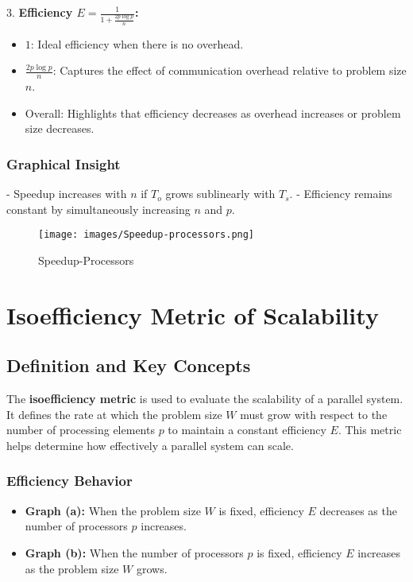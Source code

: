 \documentclass[12pt,a4paper]{article}
\begin{document}
3. \textbf{Efficiency \( E = \frac{1}{1 + \frac{2p \log p}{n}} \):}
    \begin{itemize}
        \item \( 1 \): Ideal efficiency when there is no overhead.
        \item \( \frac{2p \log p}{n} \): Captures the effect of communication overhead relative to problem size \( n \).
        \item Overall: Highlights that efficiency decreases as overhead increases or problem size decreases.
    \end{itemize}

\subsubsection{Graphical Insight}
- Speedup increases with \( n \) if \( T_o \) grows sublinearly with \( T_s \).
- Efficiency remains constant by simultaneously increasing \( n \) and \( p \).


\begin{figure}[h!]
    \centering
    \texttt{[image: images/Speedup-processors.png]}
    \caption{Speedup-Processors}
    \label{fig:enter-label}
\end{figure}





\section{Isoefficiency Metric of Scalability}

\subsection{Definition and Key Concepts}
The \textbf{isoefficiency metric} is used to evaluate the scalability of a parallel system. It defines the rate at which the problem size $W$ must grow with respect to the number of processing elements $p$ to maintain a constant efficiency $E$. This metric helps determine how effectively a parallel system can scale.

\subsubsection{Efficiency Behavior}
\begin{itemize}
    \item \textbf{Graph (a):} When the problem size $W$ is fixed, efficiency $E$ decreases as the number of processors $p$ increases.
    \item \textbf{Graph (b):} When the number of processors $p$ is fixed, efficiency $E$ increases as the problem size $W$ grows.
\end{itemize}
\end{document}
